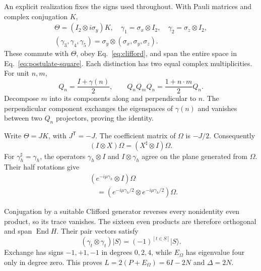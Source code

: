 \documentclass[aps,prx,reprint,longbibliography]{revtex4-2}
\begin{document}
An explicit realization fixes the signs used throughout. With Pauli matrices and complex conjugation $K$,
\begin{equation}
 \begin{gathered}
 \Theta=(I_2\otimes i\sigma_y)K,\quad
 \gamma_1=\sigma_x\otimes I_2,\quad\gamma_2=\sigma_z\otimes I_2,\\
 (\gamma_3,\gamma_4,\gamma_5)
 =\sigma_y\otimes(\sigma_x,\sigma_y,\sigma_z).
 \end{gathered}
 \label{ap:gammas}
\end{equation}
These commute with $\Theta$, obey Eq.~\eqref{eq:clifford}, and span the entire space in Eq.~\eqref{eq:postulate-square}. Each distinction has two equal complex multiplicities. For unit $n,m$,
\begin{equation}
 Q_n=\frac{I+\gamma(n)}2,\qquad
 Q_nQ_mQ_n=\frac{1+n\cdot m}{2}Q_n.
 \label{ap:sideoverlap}
\end{equation}
Decompose $m$ into its components along and perpendicular to $n$. The perpendicular component exchanges the eigenspaces of $\gamma(n)$ and vanishes between two $Q_n$ projectors, proving the identity.

Write $\Theta=JK$, with $J^{\mathsf T}=-J$. The coefficient matrix of $\Omega$ is $-J/2$. Consequently
\begin{equation}
 (I\otimes X)\Omega=(X^\sharp\otimes I)\Omega.
 \label{ap:crossing}
\end{equation}
For $\gamma_h^\sharp=\gamma_h$, the operators $\gamma_h\otimes I$ and $I\otimes\gamma_h$ agree on the plane generated from $\Omega$. Their half rotations give
\begin{equation}
 \begin{aligned}
 &(e^{-i\mu\gamma_h}\otimes I)\Omega\\
 &\quad=(e^{-i\mu\gamma_h/2}\otimes e^{-i\mu\gamma_h/2})\Omega.
 \end{aligned}
 \label{ap:clockhalves}
\end{equation}

Conjugation by a suitable Clifford generator reverses every nonidentity even product, so its trace vanishes. The sixteen even products are therefore orthogonal and span $\operatorname{End}H$. Their pair vectors satisfy
\begin{equation}
 (\gamma_t\otimes\gamma_t)\lvert S\rangle=(-1)^{[t\in S]}\lvert S\rangle.
 \label{ap:eigenbasis}
\end{equation}
Exchange has signs $-1,+1,-1$ in degrees $0,2,4$, while $E_\Omega$ has eigenvalue four only in degree zero. This proves $L=2(P+E_\Omega)=6I-2N$ and $\Delta=2N$.
\end{document}
